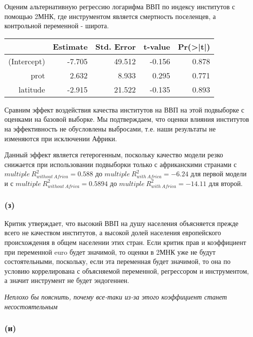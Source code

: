 \documentclass[a4paper,12pt]{article} %
\begin{document}
Оценим альтернативную регрессию логарифма ВВП по индексу институтов с помощью 2МНК, где инструментом является смертность  поселенцев, а контрольной переменной - широта.


\begin{table}[h!]
	\centering
	\begin{tabular}{rrrrr}
		\hline
		& Estimate & Std. Error & t-value & Pr(>|t|) \\ 
		\hline
		(Intercept) &  -7.705 &    49.512 & -0.156  &  0.878  \\ 
		prot &  2.632   &   8.933 &  0.295 &   0.771 \\ 
		latitude &  -2.915  &   21.522 & -0.135 &   0.893   
		\\ 
		\hline
	\end{tabular}
\end{table}	




Сравним эффект воздействия качества институтов на ВВП на этой
подвыборке с оценками на базовой выборке. 
Мы подтверждаем, что оценки влияния институтов на эффективность не обусловлены выбросами, т.е. наши результаты  не изменяются при  исключении Африки. 

Данный эффект является гетерогенным, поскольку качество модели резко снижается при использовании подвыборки только с африканскими странами с $ multiple \ R^2_{without \ Africa} = 0.588   $ до $ multiple \ R^2_{with \ Africa} = -6.24  $  для первой модели и с $ multiple \ R^2_{without \ Africa} = 0.5894   $  до $ multiple \ R^2_{with \ Africa} = -14.11   $  для второй.   
	
\subsubsection*{(з)}	

Критик утверждает, что высокий ВВП на душу
населения 
объясняется прежде всего не качеством институтов, а высокой долей
населения европейского происхождения в общем населении этих стран.
Если критик прав и коэффициент при переменной euro будет значимой, то оценки в 2МНК уже не будут  состоятельными, поскольку, если эта переменная будет значимой, то она по условию коррелирована с объясняемой переменной, регрессором и инструментом, а значит инструмент не будет эндогеннен.
  
\textit{Неплохо бы пояснить, почему все-таки из-за этого коэффициент станет несостоятельным}


\subsubsection*{(и)}	
\end{document}
